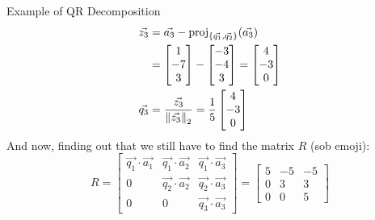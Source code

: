 \begin{ln-explain}{Example of QR Decomposition}{}
\begin{align*}
        \vec{z_3} &= \vec{a_3} - \text{proj}_{\{\vec{q_1}, \vec{q_2}\}}(\vec{a_3}) \\
        &= \begin{bmatrix} 1 \\ -7 \\ 3 \end{bmatrix} - \begin{bmatrix} -3 \\ -4 \\ 3 \end{bmatrix} = \begin{bmatrix} 4 \\ -3 \\ 0 \end{bmatrix} \\
        \vec{q_3} &= \frac{\vec{z_3}}{{\| \vec{z_3} \|}_{2}^{}} = \frac{1}{5} \begin{bmatrix} 4 \\ -3 \\ 0 \end{bmatrix}
    \end{align*}
    And now, finding out that we still have to find the matrix $R$ (sob emoji):
    \[
        R = 
        \begin{bmatrix}
            \vec{q_1} \cdot \vec{a_1} & \vec{q_1} \cdot \vec{a_2} & \vec{q_1} \cdot \vec{a_3} \\
            0 & \vec{q_2} \cdot \vec{a_2} & \vec{q_2} \cdot \vec{a_3} \\
            0 & 0 & \vec{q_3} \cdot \vec{a_3}
        \end{bmatrix}
        =
        \begin{bmatrix}
            5 & -5 & -5 \\
            0 & 3 & 3 \\
            0 & 0 & 5
        \end{bmatrix}
    \]
\end{ln-explain}
